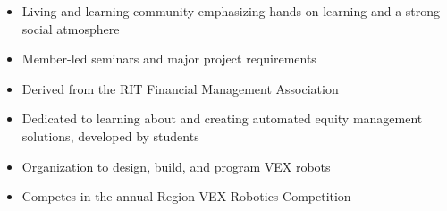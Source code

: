 \documentclass[10pt,a4paper,ragged2e,withhyper]{altacv}
\begin{document}
\begin{paracol}{2}
\medskip


\begin{itemize}
    \item Living and learning community emphasizing hands-on learning and a strong social atmosphere
    \item Member-led seminars and major project requirements
\end{itemize}

\divider

\begin{itemize}
    \item Derived from the RIT Financial Management Association
    \item Dedicated to learning about and creating automated equity management solutions, developed by students
\end{itemize}

\divider

\begin{itemize}
    \item Organization to design, build, and program VEX robots
    \item Competes in the annual Region VEX Robotics Competition
\end{itemize}
\switchcolumn


\par\vspace{.15cm}
\par

\divider\smallskip

\par\vspace{.15cm}
\par\vspace{.15cm}


\end{paracol}
\end{document}
